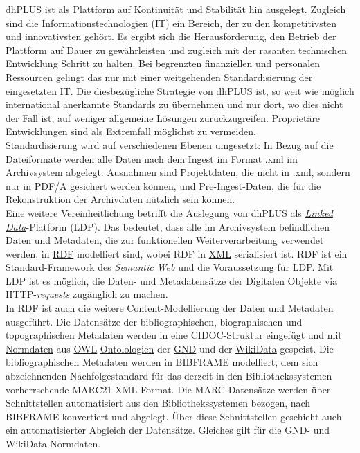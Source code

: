 \documentclass{article}
\begin{document}
        dhPLUS ist als Plattform auf Kontinuität und Stabilität hin ausgelegt. Zugleich sind die Informationstechnologien (IT) ein Bereich, der zu den kompetitivsten und innovativsten gehört. Es ergibt sich die Herausforderung, den Betrieb der Plattform auf Dauer zu gewährleisten und zugleich mit der rasanten technischen Entwicklung Schritt zu halten. Bei begrenzten finanziellen und personalen Ressourcen gelingt das nur mit einer weitgehenden Standardisierung der eingesetzten IT. Die diesbezügliche Strategie von dhPLUS ist, so weit wie möglich international anerkannte Standards zu übernehmen und nur dort, wo dies nicht der Fall ist, auf weniger allgemeine Lösungen zurückzugreifen. Proprietäre Entwicklungen sind als Extremfall möglichst zu vermeiden.\\
            
        Standardisierung wird auf verschiedenen Ebenen umgesetzt: In Bezug auf die Dateiformate werden alle Daten nach dem Ingest im Format .xml im Archivsystem abgelegt. Ausnahmen sind Projektdaten, die nicht in .xml, sondern nur in PDF/A gesichert werden können, und Pre-Ingest-Daten, die für die Rekonstruktion der Archivdaten nützlich sein können.\\
            
        Eine weitere Vereinheitlichung betrifft die Auslegung von dhPLUS als \emph{\href{http://gams.uni-graz.at/o:konde.8}{Linked Data}}-Platform (LDP). Das bedeutet, dass alle im Archivsystem befindlichen Daten und Metadaten, die zur funktionellen Weiterverarbeitung verwendet werden, in \href{http://gams.uni-graz.at/o:konde.131}{RDF} modelliert sind, wobei RDF in \href{http://gams.uni-graz.at/o:konde.215}{XML} serialisiert ist. RDF ist ein Standard-Framework des \emph{\href{http://gams.uni-graz.at/o:konde.167}{Semantic Web}} und die Voraussetzung für LDP. Mit LDP ist es möglich, die Daten- und Metadatensätze der Digitalen Objekte via HTTP-\emph{requests} zugänglich zu machen.\\
            
        In RDF ist auch die weitere Content-Modellierung der Daten und Metadaten ausgeführt. Die Datensätze der bibliographischen, biographischen und topographischen Metadaten werden in eine CIDOC-Struktur eingefügt und mit \href{http://gams.uni-graz.at/o:konde.147}{Normdaten} aus \href{http://gams.uni-graz.at/o:konde.131}{OWL}-\href{http://gams.uni-graz.at/o:konde.151}{Ontolologien} der \href{http://gams.uni-graz.at/o:konde.109}{GND} und der \href{http://gams.uni-graz.at/o:konde.112}{WikiData} gespeist. Die bibliographischen Metadaten werden in BIBFRAME modelliert, dem sich abzeichnenden Nachfolgestandard für das derzeit in den Bibliothekssystemen vorherrschende MARC21-XML-Format. Die MARC-Datensätze werden über Schnittstellen automatisiert aus den Bibliothekssystemen bezogen, nach BIBFRAME konvertiert und abgelegt. Über diese Schnittstellen geschieht auch ein automatisierter Abgleich der Datensätze. Gleiches gilt für die GND- und WikiData-Normdaten.\\
            
\end{document}
